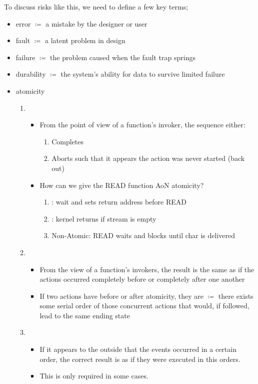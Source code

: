 \documentclass[../../lecture_notes.tex]{subfiles}
\begin{document}
To discuss risks like this, we need to define a few key terms;
\begin{itemize}
\item error $\coloneqq$ a mistake by the designer or user
\item fault $\coloneqq$ a latent problem in design
\item failure $\coloneqq$ the problem caused when the fault trap springs
\item durability $\coloneqq$ the system’s ability for data to survive limited failure
\item atomicity
	\begin{enumerate}
		\item {}
			\begin{itemize}
				\item From the point of view of a function’s invoker, the sequence either:
					\begin{enumerate}
						\item Completes
						\item Aborts such that it appears the action was never started (back out)
					\end{enumerate}
				\item How can we give the READ function AoN atomicity?
					\begin{enumerate}
						\item {}: wait and sets return address before READ
						\item {}: kernel returns {} if stream is empty
						\item Non-Atomic: READ waits and blocks until char is delivered
					\end{enumerate}
			\end{itemize}
		\item {}
			\begin{itemize}
				\item From the view of a function’s invokers, the result is the same as if the actions occurred completely before or completely after one another
				\item If two actions have before or after atomicity, they are  $\coloneqq$ there exists some serial order of those concurrent actions that would, if followed, lead to the same ending state
			\end{itemize}
		\item {} 
			\begin{itemize} 
				\item If it appears to the outside that the events occurred in a certain order, the correct result is as if they were executed in this orders. 
				\item This is only required in some cases.
			\end{itemize}
	\end{enumerate}
\end{itemize}
\end{document}

